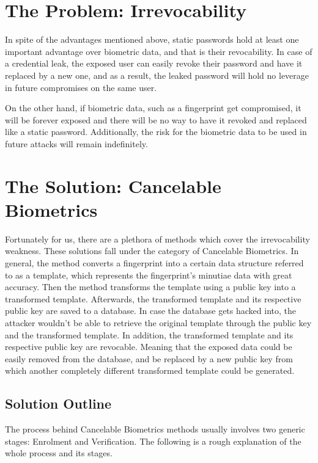 \documentclass[fyp]{socreport}
\begin{document}
\section{The Problem: Irrevocability}
In spite of the advantages mentioned above, static passwords hold at least one important advantage over biometric data, and that is their revocability. In case of a credential leak, the exposed user can easily revoke their password and have it replaced by a new one, and as a result, the leaked password will hold no leverage in future compromises on the same user.

On the other hand, if biometric data, such as a fingerprint get compromised, it will be forever exposed and there will be no way to have it revoked and replaced like a static password. Additionally, the risk for the biometric data to be used in future attacks will remain indefinitely.

\section{The Solution: Cancelable Biometrics}
Fortunately for us, there are a plethora of methods which cover the irrevocability weakness. These solutions fall under the category of Cancelable Biometrics. In general, the method converts a fingerprint into a certain data structure referred to as a template, which represents the fingerprint's minutiae data with great accuracy. Then the method transforms the template using a public key into a transformed template. Afterwards, the transformed template and its respective public key are saved to a database. In case the database gets hacked into, the attacker wouldn't be able to retrieve the original template through the public key and the transformed template. In addition, the transformed template and its respective public key are revocable. Meaning that the exposed data could be easily removed from the database, and be replaced by a new public key from which another completely different transformed template could be generated.

\subsection{Solution Outline}
\label{sol}
The process behind Cancelable Biometrics methods usually involves two generic stages: Enrolment and Verification. The following is a rough explanation of the whole process and its stages.
\end{document}
